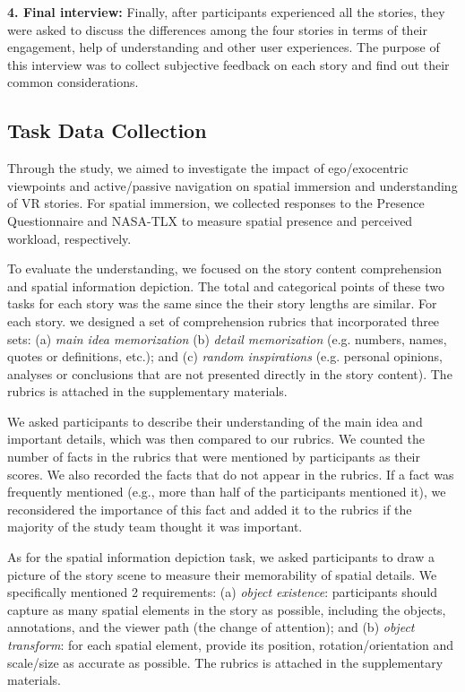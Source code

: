 \noindent{}\textbf{4. Final interview:} Finally, after participants experienced all the stories, they were asked to discuss the differences among the four stories in terms of their engagement, help of understanding and other user experiences. 
The purpose of this interview was to collect subjective feedback on each story and find out their common considerations.

\subsection{Task Data Collection}
\label{subsec:DataCollection}
Through the study, we aimed to investigate the impact of ego/exocentric viewpoints and active/passive navigation on spatial immersion and understanding of VR stories. 
For spatial immersion, we collected responses to the Presence Questionnaire \cite{berkman2021group} and NASA-TLX \cite{hart1988development} to measure spatial presence and perceived workload, respectively. 

To evaluate the understanding, we focused on the story content comprehension and spatial information depiction. 
The total and categorical points of these two tasks for each story was the same since the their story lengths are similar.
For each story. we designed a set of comprehension rubrics that incorporated three sets: (a) \textit{main idea memorization} (b) \textit{detail memorization} (e.g. numbers, names, quotes or definitions, etc.); and (c) \textit{random inspirations} (e.g. personal opinions, analyses or conclusions that are not presented directly in the story content).
The rubrics is attached in the supplementary materials.

We asked participants to describe their understanding of the main idea and important details, which was then compared to our rubrics. 
We counted the number of facts in the rubrics that were mentioned by participants as their scores.
We also recorded the facts that do not appear in the rubrics.
If a fact was frequently mentioned (e.g., more than half of the participants mentioned it), we reconsidered the importance of this fact and added it to the rubrics if the majority of the study team thought it was important.
 

As for the spatial information depiction task, we asked participants to draw a picture of the story scene to measure their memorability of spatial details. We specifically mentioned 2 requirements: (a) \textit{object existence}: participants should capture as many spatial elements in the story as possible, including the objects, annotations, and the viewer path (the change of attention); and (b) \textit{object transform}: for each spatial element, provide its position, rotation/orientation and scale/size as accurate as possible.
The rubrics is attached in the supplementary materials.

